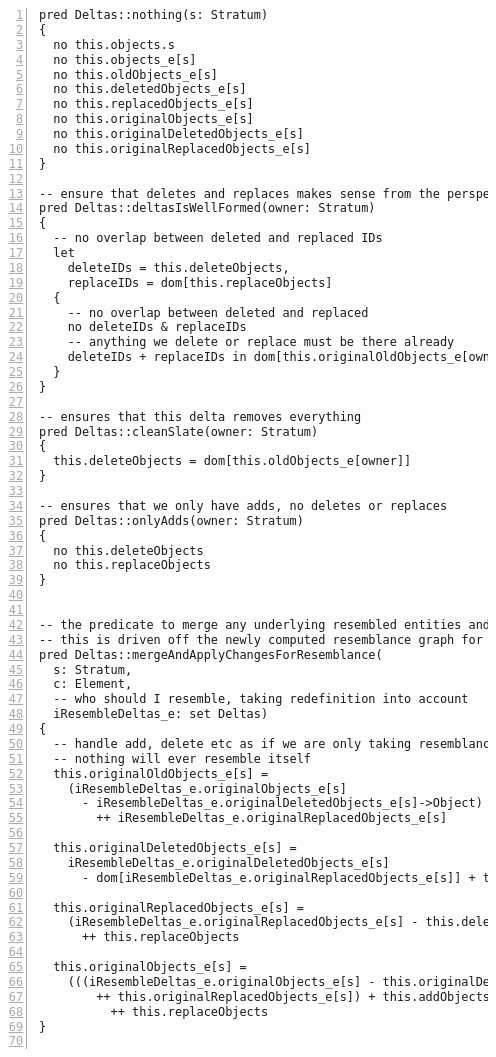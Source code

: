 \begin{lstlisting}[caption={deltas.als}, numbers=left]
pred Deltas::nothing(s: Stratum)
{
  no this.objects.s
  no this.objects_e[s]
  no this.oldObjects_e[s]
  no this.deletedObjects_e[s]
  no this.replacedObjects_e[s]
  no this.originalObjects_e[s]
  no this.originalDeletedObjects_e[s]
  no this.originalReplacedObjects_e[s]
}

-- ensure that deletes and replaces makes sense from the perspective of the original stratum
pred Deltas::deltasIsWellFormed(owner: Stratum)
{
  -- no overlap between deleted and replaced IDs
  let
    deleteIDs = this.deleteObjects,
    replaceIDs = dom[this.replaceObjects]
  {
    -- no overlap between deleted and replaced
    no deleteIDs & replaceIDs
    -- anything we delete or replace must be there already
    deleteIDs + replaceIDs in dom[this.originalOldObjects_e[owner]]
  }
}

-- ensures that this delta removes everything
pred Deltas::cleanSlate(owner: Stratum)
{
  this.deleteObjects = dom[this.oldObjects_e[owner]]
}

-- ensures that we only have adds, no deletes or replaces
pred Deltas::onlyAdds(owner: Stratum)
{
  no this.deleteObjects
  no this.replaceObjects
}


-- the predicate to merge any underlying resembled entities and apply current changes
-- this is driven off the newly computed resemblance graph for each component in each stratum
pred Deltas::mergeAndApplyChangesForResemblance(
  s: Stratum,
  c: Element,
  -- who should I resemble, taking redefinition into account
  iResembleDeltas_e: set Deltas)
{
  -- handle add, delete etc as if we are only taking resemblance into account
  -- nothing will ever resemble itself
  this.originalOldObjects_e[s] =
    (iResembleDeltas_e.originalObjects_e[s]
      - iResembleDeltas_e.originalDeletedObjects_e[s]->Object)
        ++ iResembleDeltas_e.originalReplacedObjects_e[s]
        
  this.originalDeletedObjects_e[s] =
    iResembleDeltas_e.originalDeletedObjects_e[s]
      - dom[iResembleDeltas_e.originalReplacedObjects_e[s]] + this.deleteObjects
    
  this.originalReplacedObjects_e[s] =
    (iResembleDeltas_e.originalReplacedObjects_e[s] - this.deleteObjects->Object)
      ++ this.replaceObjects
      
  this.originalObjects_e[s] = 
    (((iResembleDeltas_e.originalObjects_e[s] - this.originalDeletedObjects_e[s]->Object)
        ++ this.originalReplacedObjects_e[s]) + this.addObjects)
          ++ this.replaceObjects  
}


\end{lstlisting}
